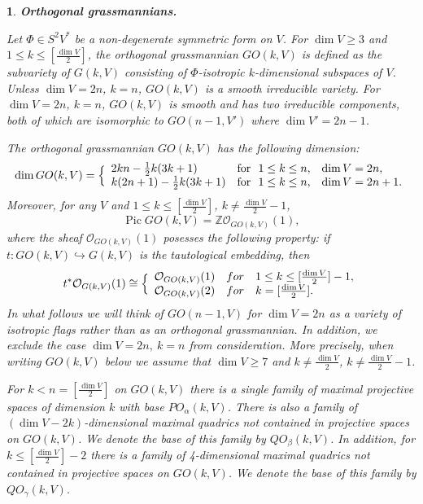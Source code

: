 \documentclass[12pt]{amsart}
\newcommand{\Pic}{\operatorname{Pic}\nolimits}
\newtheorem{sub}[subsection]{}
\theoremstyle{definition}
\begin{document}
\begin{sub}{\bf Orthogonal grassmannians.}\label{linear ortho ind-grassm}
\rm

Let $\Phi\in S^2V^*$ be a non-degenerate symmetric form on $V$.
For $\dim V\ge3$ and  $1\le k\le[\frac{\dim V}{2}]$, the \textit{orthogonal grassmannian} $GO(k,V)$ is defined as the
subvariety of $G(k,V)$ consisting of $\Phi$-isotropic $k$-dimensional subspaces of $V$.
Unless $\dim V=2n$, $k=n$, $GO(k,V)$ is a smooth irreducible variety.
For $\dim V=2n$, $k=n$, $GO(k,V)$ is smooth and has two irreducible components, both of which are isomorphic to
$GO(n-1,V')$ where $\dim V'=2n-1$.

The orthogonal grassmannian $GO(k,V)$ has the following dimension:
$$
\dim GO(k,V)=\Bigl\{
\begin{array}{lll}
2kn-\frac{1}{2}k(3k+1) & \textrm{for}\ \ 1\le k\le n, & \dim V=2n, \\
k(2n+1)-\frac{1}{2}k(3k+1) & \textrm{for}\ \ 1\le k\le n, & \dim V=2n+1.
\end{array}
$$
Moreover, for any $V$ and $1\le k\le[\frac{\dim V}{2}]$, $k\ne\frac{\dim V}{2}-1$,
$$
\Pic GO(k,V)=\mathbb{Z}\mathcal{O}_{GO(k,V)}(1),
$$
where the sheaf $\mathcal{O}_{GO(k,V)}(1)$ posesses the following property: if $t: GO(k,V)\hookrightarrow G(k,V)$
is the tautological embedding, then
$$
t^*\mathcal{O}_{G(k,V)}(1)\cong\Bigl\{
\begin{array}{lll}
\mathcal{O}_{GO(k,V)}(1) & for & 1\le k\le [\frac{\dim V}{2}]-1, \\
\mathcal{O}_{GO(k,V)}(2) &  for & k=[\frac{\dim V}{2}].
\end{array}
$$
In what follows we will think of $GO(n-1,V)$ for $\dim V=2n$ as a variety of isotropic flags rather than as an
orthogonal grassmannian. In addition, we exclude the case $\dim V=2n,\ k=n$ from consideration.
More precisely, when writing $GO(k,V)$ below
we assume that $\dim V\ge7$ and $k\ne\frac{\dim V}{2}$, $k\ne\frac{\dim V}{2}-1$.

For $k<n=[\frac{\dim V}{2}]$ on $GO(k,V)$ there is a single family of maximal projective spaces of dimension $k$
with base $PO_{\alpha}(k,V)$. There is also a family of $(\dim V-2k)$-dimensional maximal quadrics not contained
in projective spaces on $GO(k,V)$. We denote the base of this family by $QO_{\beta}(k,V)$.
In addition, for $k\le[\frac{\dim V}{2}]-2$ there is a family of 4-dimensional maximal quadrics not contained
in projective spaces on $GO(k,V)$. We denote the base of this family by $QO_{\gamma}(k,V)$.


\end{sub}
\end{document}
